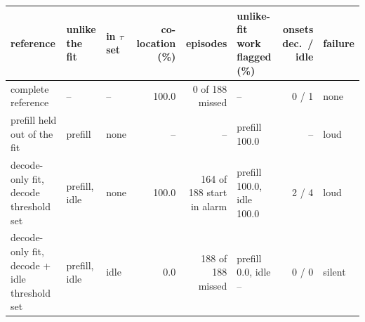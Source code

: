 \begin{tabular}{lllrrlrl}
\toprule
reference & unlike the fit & in $\tau$ set & co-location (\%) & episodes & unlike-fit work flagged (\%) & onsets dec.\ / idle & failure \\
\midrule
complete reference & -- & -- & 100.0 & 0 of 188 missed & -- & 0 / 1 & none \\
prefill held out of the fit & prefill & none & -- & -- & prefill 100.0 & -- & loud \\
decode-only fit, decode threshold set & prefill, idle & none & 100.0 & 164 of 188 start in alarm & prefill 100.0, idle 100.0 & 2 / 4 & loud \\
decode-only fit, decode + idle threshold set & prefill, idle & idle & 0.0 & 188 of 188 missed & prefill 0.0, idle -- & 0 / 0 & silent \\
\bottomrule
\end{tabular}
